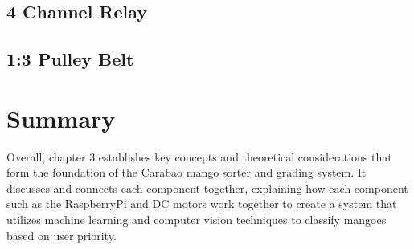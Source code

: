 \subsection{4 Channel Relay}

\subsection{1:3 Pulley Belt}


\section{Summary}

Overall, chapter 3 establishes key concepts and theoretical considerations that form the foundation of the Carabao mango sorter and grading system. It discusses and connects each component together, explaining how each component such as the RaspberryPi and DC motors work together to create a system that utilizes machine learning and computer vision techniques to classify mangoes based on user priority.
